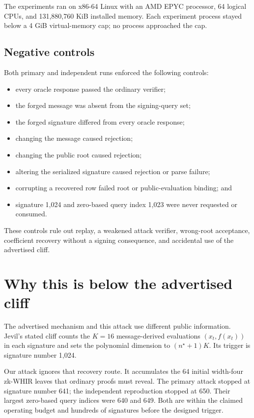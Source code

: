 \documentclass[10pt,a4paper]{article}
\begin{document}
The experiments ran on x86-64 Linux with an AMD EPYC processor, 64 logical
CPUs, and 131,880,760 KiB installed memory. Each experiment process stayed
below a 4 GiB virtual-memory cap; no process approached the cap.

\subsection{Negative controls}

Both primary and independent runs enforced the following controls:
\begin{itemize}
  \item every oracle response passed the ordinary verifier;
  \item the forged message was absent from the signing-query set;
  \item the forged signature differed from every oracle response;
  \item changing the message caused rejection;
  \item changing the public root caused rejection;
  \item altering the serialized signature caused rejection or parse failure;
  \item corrupting a recovered row failed root or public-evaluation binding;
        and
  \item signature 1,024 and zero-based query index 1,023 were never requested
        or consumed.
\end{itemize}
These controls rule out replay, a weakened attack verifier, wrong-root
acceptance, coefficient recovery without a signing consequence, and accidental
use of the advertised cliff.

\section{Why this is below the advertised cliff}
\label{sec:cliff}

The advertised mechanism and this attack use different public information.
Jevil's stated cliff counts the $K=16$ message-derived evaluations
$(x_t,f(x_t))$ in each signature and sets the polynomial dimension to
$(n^\star+1)K$. Its trigger is signature number 1,024.

Our attack ignores that recovery route. It accumulates the 64 initial
width-four zk-WHIR leaves that ordinary proofs must reveal. The primary attack
stopped at signature number 641; the independent reproduction stopped at 650.
Their largest zero-based query indices were 640 and 649. Both are within the
claimed operating budget and hundreds of signatures before the designed
trigger.
\end{document}
